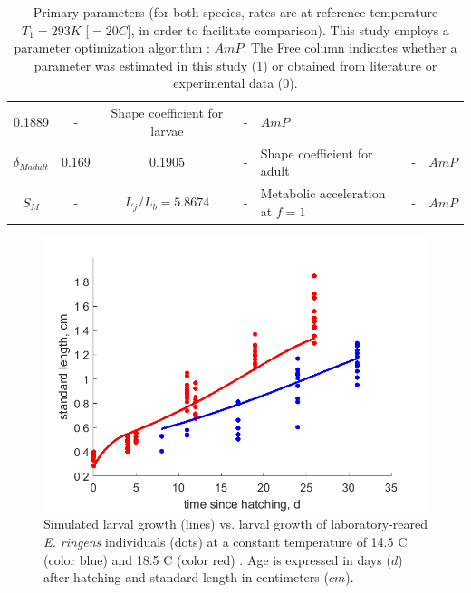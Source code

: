 \begin{table}[ht]
\begin{adjustbox}{width=1.2\textwidth}
\begin{tabular}{c|c|c|c|l|c|c}
0.1889							& 
-								& 
Shape coefficient for larvae	& 
-								&
$AmP$							\\
$\delta_{Madult}$			& 
0.169						& 
0.1905						& 
-							& 
Shape coefficient for adult	& 
-							&
$AmP$						\\
$S_{M}$								& 
-									& 
$L_{j}/L_{b} = 5.8674$				& 
-									& 
Metabolic acceleration at $f = 1$	& 
-									&
$AmP$								\\
\end{tabular}
\end{adjustbox}
\caption{Primary parameters (for both species, rates are at reference temperature $T_{1} = 293 K$  [$=20$\textdegree $C$], in order to facilitate comparison). This study employs a parameter optimization algorithm : $AmP$. The Free column indicates whether a parameter was estimated in this study (1) or obtained from literature or experimental data (0).}
\label{param_compar}
\end{table}

\begin{figure}[H]
	\includegraphics[width=1.0\textwidth]{figures/Chap4LarvaDataVSModel.png}
	\centering
	\caption{Simulated larval growth (lines) vs. larval growth of laboratory-reared \textit{E. ringens} individuals (dots) at a constant temperature of 14.5 \textdegree C (color blue) and 18.5 \textdegree C (color red) \citep{RiouOfel2021}. Age is expressed in days ($d$) after hatching and standard length in centimeters ($cm$).}
	\label{Chap4LarvaDataVSModel}
\end{figure}

